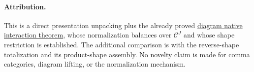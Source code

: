 \documentclass{article}
\begin{document}
\paragraph{Attribution.} This is a direct presentation unpacking plus the already proved \href{https://github.com/eternal-november/eos-research-programmes/blob/main/projects/contextual-composition/foundations/diagram-native-interaction/Diagram_Lifting_of_Presented_Native_Interaction.tex}{diagram native interaction theorem}, whose normalization balances over $\mathcal C^J$ and whose shape restriction is established. The additional comparison is with the reverse-shape totalization and its product-shape assembly. No novelty claim is made for comma categories, diagram lifting, or the normalization mechanism.
\end{document}
